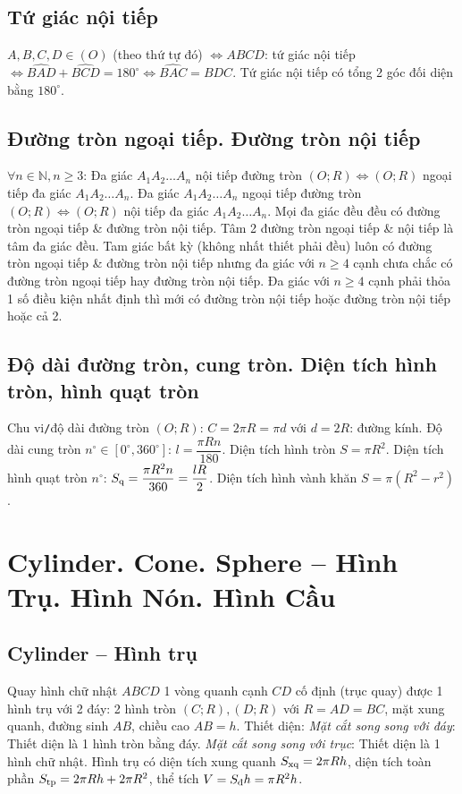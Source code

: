 \documentclass{article}
\begin{document}
\subsection{Tứ giác nội tiếp}
 $A,B,C,D\in(O)$ (theo thứ tự đó) $\Leftrightarrow ABCD$: tứ giác nội tiếp $\Leftrightarrow\widehat{BAD} + \widehat{BCD} = 180^\circ\Leftrightarrow\widehat{BAC} = \widehat{BDC}$.  Tứ giác nội tiếp có tổng 2 góc đối diện bằng $180^\circ$.

\subsection{Đường tròn ngoại tiếp. Đường tròn nội tiếp}
$\forall n\in\mathbb{N},n\ge3$:  Đa giác $A_1A_2\ldots A_n$ nội tiếp đường tròn $(O;R)\Leftrightarrow(O;R)$ ngoại tiếp đa giác $A_1A_2\ldots A_n$.  Đa giác $A_1A_2\ldots A_n$ ngoại tiếp đường tròn $(O;R)\Leftrightarrow(O;R)$ nội tiếp đa giác $A_1A_2\ldots A_n$.  Mọi đa giác đều đều có đường tròn ngoại tiếp \& đường tròn nội tiếp. Tâm 2 đường tròn ngoại tiếp \& nội tiếp là tâm đa giác đều.  Tam giác bất kỳ (không nhất thiết phải đều) luôn có đường tròn ngoại tiếp \& đường tròn nội tiếp nhưng đa giác với $n\ge4$ cạnh chưa chắc có đường tròn ngoại tiếp hay đường tròn nội tiếp. Đa giác với $n\ge4$ cạnh phải thỏa 1 số điều kiện nhất định thì mới có đường tròn nội tiếp hoặc đường tròn nội tiếp hoặc cả 2.

\subsection{Độ dài đường tròn, cung tròn. Diện tích hình tròn, hình quạt tròn}
 Chu vi{\tt/}độ dài đường tròn $(O;R)$: $C = 2\pi R = \pi d$ với $d = 2R$: đường kính. Độ dài cung tròn $n^\circ\in[0^\circ,360^\circ]$: $l = \dfrac{\pi Rn}{180}$.  Diện tích hình tròn $S = \pi R^2$. Diện tích hình quạt tròn $n^\circ$: $S_{\rm q} = \dfrac{\pi R^2n}{360} = \dfrac{lR}{2}$.  Diện tích hình vành khăn $S = \pi(R^2 - r^2)$.


\section{Cylinder. Cone. Sphere -- Hình Trụ. Hình Nón. Hình Cầu}

\subsection{Cylinder -- Hình trụ}
 Quay hình chữ nhật $ABCD$ 1 vòng quanh cạnh $CD$ cố định (trục quay) được 1 hình trụ với 2 đáy: 2 hình tròn $(C;R),(D;R)$ với $R = AD = BC$, mặt xung quanh, đường sinh $AB$, chiều cao $AB = h$.  {\sf Thiết diện}: \textit{Mặt cắt song song với đáy}: Thiết diện là 1 hình tròn bằng đáy. \textit{Mặt cắt song song với trục}: Thiết diện là 1 hình chữ nhật.  Hình trụ có diện tích xung quanh $S_{\rm xq} = 2\pi Rh$, diện tích toàn phần $S_{\rm tp} = 2\pi Rh + 2\pi R^2$, thể tích $V = S_{\scriptsize\mbox{\rm đ}}h = \pi R^2h$.
\end{document}
